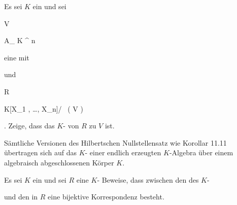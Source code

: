 {


Es sei $K$ ein
 und sei


\mavergleichskette

{\vergleichskette

{V
}

{ \subseteq }{ { {\mathbb A}_{  K }^{  n   } }
}

{  }{
}

{    }{
}

{   }{
}

}
{}{}{}
eine
mit


 und


\mavergleichskettedisp

{\vergleichskette

{R
}

{ } { K[X_1 , \ldots , X_n]/  \, \left(   V   \right)
}

{ } {
}

{ } {
}

{ } {
}

}
{}{}{.}
Zeige, dass das
$K$-
von $R$
zu $V$ ist.


}

{} {}


Sämtliche Versionen des Hilbertschen Nullstellensatz wie
Korollar 11.11
übertragen sich auf das
$K$-
einer endlich erzeugten $K$-Algebra über einem algebraisch abgeschlossenen Körper $K$.



{}

{


Es sei $K$ ein
und sei $R$ eine
$K$-
Beweise, dass zwischen den
des
$K$-


 und den
in $R$ eine bijektive Korrespondenz besteht.


}

{} {}



{}


